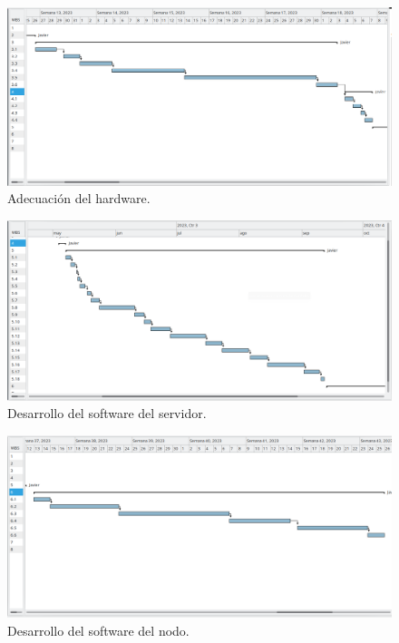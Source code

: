 \documentclass[
11pt, %
]{charter}
\begin{document}
\begin{landscape}
\begin{figure}[htpb]
\centering 
\includegraphics[height=.7\textheight]{./Figuras/Gantt_3-4.png}
\caption{Adecuación del hardware.}
\label{fig:diagGantt}
\end{figure}
\end{landscape}

\begin{landscape}
\begin{figure}[htpb]
\centering 
\includegraphics[height=.7\textheight]{./Figuras/Gantt_5.png}
\caption{Desarrollo del software del servidor.}
\label{fig:diagGantt}
\end{figure}
\end{landscape}

\begin{landscape}
\begin{figure}[htpb]
\centering 
\includegraphics[height=.7\textheight]{./Figuras/Gantt_6.png}
\caption{Desarrollo del software del nodo.}
\label{fig:diagGantt}
\end{figure}
\end{landscape}
\end{document}
